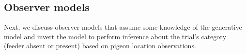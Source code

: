 \documentclass{article}
\newcommand{\mu}{\boldsymbol\upmu}
\newcommand{\sig}{\sigma}
\newcommand{\be}{\begin{equation}}
\newcommand{\ee}{\end{equation}}
\newcommand{\xx}{\mathbf{x}}
\newcommand{\zz}{\mathbf{z}}
\begin{document}

\subsection*{Observer models}
Next, we discuss observer models that assume some knowledge of the generative model and invert the model to perform inference about the trial's category (feeder absent or present) based on pigeon location observations.
\end{document}
